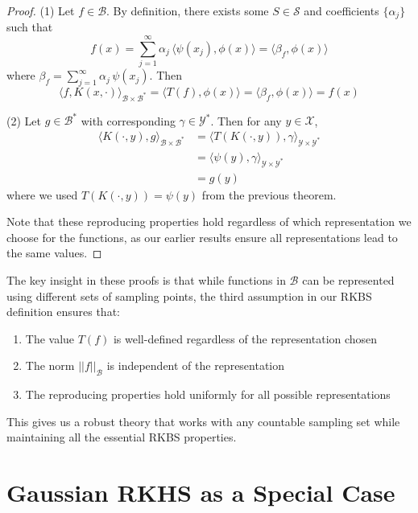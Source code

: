 \begin{proof}
(1) Let $f\in \mathcal{B}$. By definition, there exists some $S \in \mathcal{S}$ and coefficients $\{\alpha_j\}$ such that
\begin{equation}
f(x) = \sum_{j=1}^\infty \alpha_j\, \langle \psi(x_j), \phi(x)\rangle = \langle \beta_f, \phi(x)\rangle
\end{equation}
where $\beta_f = \sum_{j=1}^\infty \alpha_j\, \psi(x_j)$. Then
\begin{equation}
\langle f, K(x,\cdot) \rangle_{\mathcal{B}\times \mathcal{B}^*} = \langle T(f), \phi(x) \rangle = \langle \beta_f, \phi(x)\rangle = f(x)
\end{equation}

(2) Let $g\in\mathcal{B}^*$ with corresponding $\gamma\in \mathcal{Y}^*$. Then for any $y \in \mathcal{X}$,
\begin{align}
\langle K(\cdot,y), g \rangle_{\mathcal{B}\times \mathcal{B}^*} &= \langle T(K(\cdot,y)), \gamma\rangle_{\mathcal{Y}\times\mathcal{Y}^*} \\
&= \langle \psi(y), \gamma\rangle_{\mathcal{Y}\times\mathcal{Y}^*} \\
&= g(y)
\end{align}
where we used $T(K(\cdot,y)) = \psi(y)$ from the previous theorem.

Note that these reproducing properties hold regardless of which representation we choose for the functions, as our earlier results ensure all representations lead to the same values.
\end{proof}

\begin{remark}
The key insight in these proofs is that while functions in $\mathcal{B}$ can be represented using different sets of sampling points, the third assumption in our RKBS definition ensures that:
\begin{enumerate}
\item The value $T(f)$ is well-defined regardless of the representation chosen
\item The norm $||f||_{\mathcal{B}}$ is independent of the representation
\item The reproducing properties hold uniformly for all possible representations
\end{enumerate}
This gives us a robust theory that works with any countable sampling set while maintaining all the essential RKBS properties.
\end{remark}


\section{Gaussian RKHS as a Special Case}

